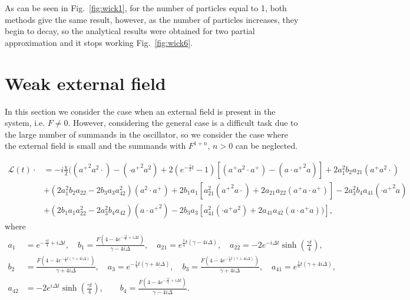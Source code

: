\documentclass[12pt]{article}
\theoremstyle{definition}
\def\ga {\gamma}
\begin{document}
	As can be seen in Fig.~\ref{fig:wick1}, for the number of particles equal to 1, both methods give the same result, however, as the number of particles increases, they begin to decay, so the analytical results were obtained for two partial approximation and it stops working Fig.~\ref{fig:wick6}.
	
	\section{Weak external field\label{sec:Efc}}
	
	In this section we consider the case when an external field is present in the system, i.e. $F \not= 0$. However, considering the general case is a difficult task due to the large number of summands in the oscillator, so we consider the case where the external field is small and the summands with $F^{1 + n}$, $n > 0$ can be neglected. 
	
	\begin{align}
		\label{eq:GenIntWithF}
		\mathcal{L}(t)\cdot &= -i\frac{\chi}{2}(({a^+}^2a^2\cdot) - (\cdot{a^+}^2a^2) + 2(e^{-\frac{\ga}{2}t} -1 ) [({a^+}a^2\cdot {a^+}) - (a\cdot{a^+}^2a) ] +2a_1^2b_2a_{21}({a^+}a^2\cdot) \nonumber\\
		&+ (2a_1^2b_2a_{22} - 2b_3a_3a_{42}^2)(a^2\cdot{a^+}) + 2b_1a_1 [a_{21}^2({a^+}^2a\cdot) + 2a_{21}a_{22}({a^+}a\cdot{a^+})] - 2a_3^2b_4a_{41}(\cdot{a^+}^2a) \\
		&+ (2b_1a_1a_{22}^2 - 2a_3^2b_4a_{42})(a\cdot{a^+}^2) - 2b_3a_3[a_{41}^2(\cdot{a^+}a^2) + 2 a_{41}a_{42}(a\cdot{a^+}a)) ]\nonumber,
	\end{align}
	where
	\begin{align*}
		a_1 &= e^{-\frac{\gamma  t}{4}+i \Delta  t}, \quad
		b_1 = \frac{F \left(4-4 e^{-\frac{\gamma  t}{4}+i \Delta  t}\right)}{\gamma -4 i \Delta }, \quad
		a_{21} = e^{\frac{1}{4} t (\gamma -4 i \Delta )}, \quad
		a_{22} = -2 e^{-i \Delta  t} \sinh \left(\frac{\gamma  t}{4}\right),\\
		b_2 &= \frac{F \left(4-4 e^{-\frac{1}{4} t (\gamma +4 i \Delta )}\right)}{\gamma +4 i \Delta }, \quad
		a_3 = e^{-\frac{1}{4} t (\gamma +4 i \Delta )}, \quad
		b_3 = \frac{F \left(4-4 e^{-\frac{1}{4} t (\gamma +4 i \Delta )}\right)}{\gamma +4 i \Delta }, \quad
		a_{41} = e^{\frac{1}{4} t (\gamma +4 i \Delta )},\\
		a_{42} &= -2 e^{i \Delta  t} \sinh \left(\frac{\gamma  t}{4}\right), \qquad
		b_4 = \frac{F \left(4-4 e^{-\frac{\gamma  t}{4}+i \Delta  t}\right)}{\gamma -4 i \Delta }.
	\end{align*}
	
\end{document}
